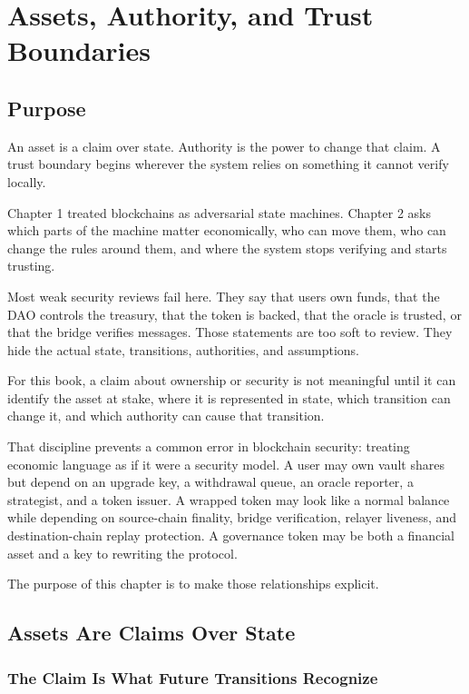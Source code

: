 \chapter{Assets, Authority, and Trust Boundaries}

\section{Purpose}

\begin{principlebox}
An asset is a claim over state. Authority is the power to change that claim. A trust boundary begins wherever the system relies on something it cannot verify locally.
\end{principlebox}

Chapter 1 treated blockchains as adversarial state machines. Chapter 2 asks which parts of the machine matter economically, who can move them, who can change the rules around them, and where the system stops verifying and starts trusting.

Most weak security reviews fail here. They say that users own funds, that the DAO controls the treasury, that the token is backed, that the oracle is trusted, or that the bridge verifies messages. Those statements are too soft to review. They hide the actual state, transitions, authorities, and assumptions.

For this book, a claim about ownership or security is not meaningful until it can identify the asset at stake, where it is represented in state, which transition can change it, and which authority can cause that transition.

That discipline prevents a common error in blockchain security: treating economic language as if it were a security model. A user may own vault shares but depend on an upgrade key, a withdrawal queue, an oracle reporter, a strategist, and a token issuer. A wrapped token may look like a normal balance while depending on source-chain finality, bridge verification, relayer liveness, and destination-chain replay protection. A governance token may be both a financial asset and a key to rewriting the protocol.

The purpose of this chapter is to make those relationships explicit.

\section{Assets Are Claims Over State}

\subsection{The Claim Is What Future Transitions Recognize}

